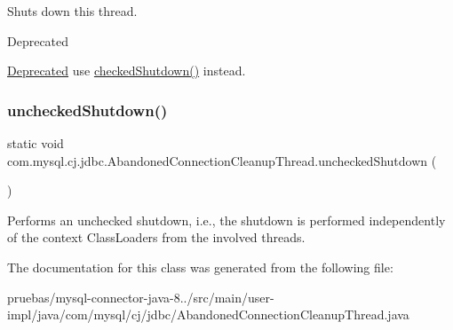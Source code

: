 Shuts down this thread.

\begin{DoxyRefDesc}{Deprecated}
\item[\mbox{\hyperlink{deprecated__deprecated000002}{Deprecated}}]use \mbox{\hyperlink{classcom_1_1mysql_1_1cj_1_1jdbc_1_1_abandoned_connection_cleanup_thread_a196b3b56aefdf849d19c4efabd56d241}{checked\+Shutdown()}} instead. \end{DoxyRefDesc}
\mbox{\label{classcom_1_1mysql_1_1cj_1_1jdbc_1_1_abandoned_connection_cleanup_thread_aa78dca88c392400bfa168afddcb88ae1}} 
\subsubsection{\texorpdfstring{unchecked\+Shutdown()}{uncheckedShutdown()}}
{\footnotesize\ttfamily static void com.\+mysql.\+cj.\+jdbc.\+Abandoned\+Connection\+Cleanup\+Thread.\+unchecked\+Shutdown (\begin{DoxyParamCaption}{ }\end{DoxyParamCaption})\hspace{0.3cm}{\ttfamily [static]}}

Performs an unchecked shutdown, i.\+e., the shutdown is performed independently of the context Class\+Loaders from the involved threads. 

The documentation for this class was generated from the following file\+:\begin{DoxyCompactItemize}
\item 
pruebas/mysql-\/connector-\/java-\/8../src/main/user-\/impl/java/com/mysql/cj/jdbc/Abandoned\+Connection\+Cleanup\+Thread.\+java\end{DoxyCompactItemize}
